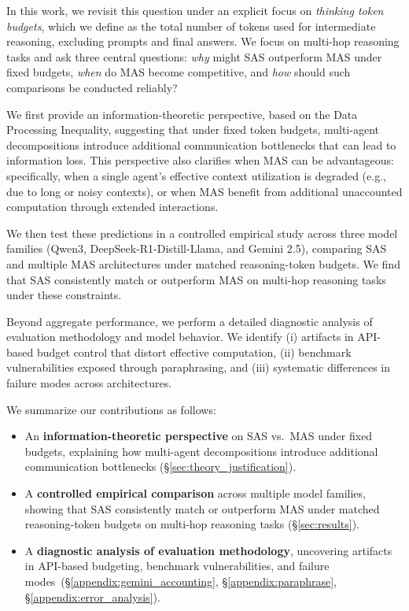 \documentclass{article} %
\begin{document}

In this work, we revisit this question under an explicit focus on \emph{thinking token budgets}, which we define as the total number of tokens used for intermediate reasoning, excluding prompts and final answers. We focus on multi-hop reasoning tasks and ask three central questions: \emph{why} might SAS outperform MAS under fixed budgets, \emph{when} do MAS become competitive, and \emph{how} should such comparisons be conducted reliably?

We first provide an information-theoretic perspective, based on the Data Processing Inequality, suggesting that under fixed token budgets, multi-agent decompositions introduce additional communication bottlenecks that can lead to information loss. This perspective also clarifies when MAS can be advantageous: specifically, when a single agent’s effective context utilization is degraded (e.g., due to long or noisy contexts), or when MAS benefit from additional unaccounted computation through extended interactions.

We then test these predictions in a controlled empirical study across three model families (Qwen3, DeepSeek-R1-Distill-Llama, and Gemini 2.5), comparing SAS and multiple MAS architectures under matched reasoning-token budgets. We find that SAS consistently match or outperform MAS on multi-hop reasoning tasks under these constraints.

Beyond aggregate performance, we perform a detailed diagnostic analysis of evaluation methodology and model behavior. We identify (i) artifacts in API-based budget control that distort effective computation, (ii) benchmark vulnerabilities exposed through paraphrasing, and (iii) systematic differences in failure modes across architectures.

We summarize our contributions as follows:

\begin{itemize}
\item An \textbf{information-theoretic perspective} on SAS vs.\ MAS under fixed budgets, explaining how multi-agent decompositions introduce additional communication bottlenecks (\S\ref{sec:theory_justification}).

\item A \textbf{controlled empirical comparison} across multiple model families, showing that SAS consistently match or outperform MAS under matched reasoning-token budgets on multi-hop reasoning tasks (\S\ref{sec:results}).

\item A \textbf{diagnostic analysis of evaluation methodology}, uncovering artifacts in API-based budgeting, benchmark vulnerabilities, and failure modes~(\S\ref{appendix:gemini_accounting}, \S\ref{appendix:paraphrase}, \S\ref{appendix:error_analysis}).

\end{itemize}
\end{document}

